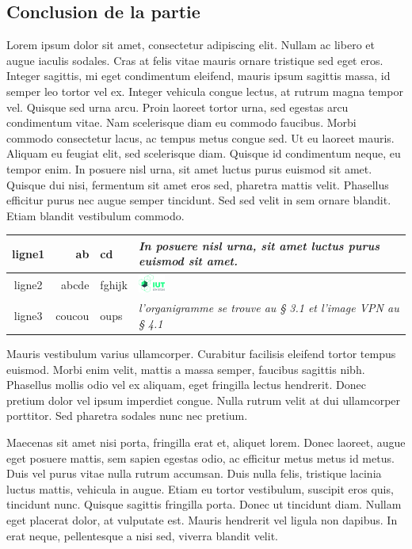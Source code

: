 \documentclass{report}
\begin{document}
\subsection{Conclusion de la partie}
Lorem ipsum dolor sit amet, consectetur adipiscing elit. Nullam ac libero et augue iaculis sodales. Cras at felis vitae mauris ornare tristique sed eget eros. Integer sagittis, mi eget condimentum eleifend, mauris ipsum sagittis massa, id semper leo tortor vel ex. Integer vehicula congue lectus, at rutrum magna tempor vel. Quisque sed urna arcu. Proin laoreet tortor urna, sed egestas arcu condimentum vitae. Nam scelerisque diam eu commodo faucibus. Morbi commodo consectetur lacus, ac tempus metus congue sed. Ut eu laoreet mauris. Aliquam eu feugiat elit, sed scelerisque diam. Quisque id condimentum neque, eu tempor enim. In posuere nisl urna, sit amet luctus purus euismod sit amet. Quisque dui nisi, fermentum sit amet eros sed, pharetra mattis velit. Phasellus efficitur purus nec augue semper tincidunt. Sed sed velit in sem ornare blandit. Etiam blandit vestibulum commodo.
\begin{center}
\begin{tabular}
{c|r||l|p{7cm}|}\hline
\rowcolor{gray}ligne1&ab&cd&\textsl{ In posuere nisl urna, sit amet luctus purus euismod sit amet.}\\
\hline
ligne2&\cellcolor{red}abcde&fghijk&\includegraphics[width=0.1\textwidth]{./images/images/logo_iut.jpg}\\
\hline
ligne3&coucou&\cellcolor{yellow}oups&\textsl{l’organigramme se trouve au § 3.1 et l’image
VPN au § 4.1}\\
\hline
\end{tabular}
\end{center}


Mauris vestibulum varius ullamcorper. Curabitur facilisis eleifend tortor tempus euismod. Morbi enim velit, mattis a massa semper, faucibus sagittis nibh. Phasellus mollis odio vel ex aliquam, eget fringilla lectus hendrerit. Donec pretium dolor vel ipsum imperdiet congue. Nulla rutrum velit at dui ullamcorper porttitor. Sed pharetra sodales nunc nec pretium.

Maecenas sit amet nisi porta, fringilla erat et, aliquet lorem. Donec laoreet, augue eget posuere mattis, sem sapien egestas odio, ac efficitur metus metus id metus. Duis vel purus vitae nulla rutrum accumsan. Duis nulla felis, tristique lacinia luctus mattis, vehicula in augue. Etiam eu tortor vestibulum, suscipit eros quis, tincidunt nunc. Quisque sagittis fringilla porta. Donec ut tincidunt diam. Nullam eget placerat dolor, at vulputate est. Mauris hendrerit vel ligula non dapibus. In erat neque, pellentesque a nisi sed, viverra blandit velit.
\end{document}
